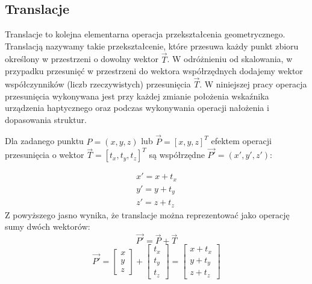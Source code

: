 \documentclass[licencjacka]{pracamgr}
\begin{document}
\subsection{Translacje}
Translacje to kolejna elementarna operacja przekształcenia geometrycznego. Translacją nazywamy takie przekształcenie, które przesuwa każdy punkt zbioru określony w przestrzeni o dowolny wektor $\vec{T}$. W odróżnieniu od skalowania, w przypadku przesunięć w przestrzeni do wektora współrzędnych dodajemy wektor współczynników (liczb rzeczywistych) przesunięcia $\vec{T}$. W niniejszej pracy operacja przesunięcia wykonywana jest przy każdej zmianie położenia wskaźnika urządzenia haptycznego oraz podczas wykonywania operacji nałożenia i dopasowania struktur. 

Dla zadanego punktu $P=(x,y,z)$ lub $\vec{P}=[x,y,z]^T$ efektem operacji przesunięcia o wektor $\vec{T}=[t_x, t_y, t_z]^T$ są współrzędne $\vec{P'}=(x',y',z')$:

$$
\begin{array}{lr}
x'=x+t_x \\
y'=y+t_y \\
z'=z+t_z
\end{array}
$$
Z powyższego jasno wynika, że translacje można reprezentować jako operację sumy dwóch wektorów:
$$
\vec{P'}=\vec{P}+\vec{T}
$$
$$
\vec{P'}
=
\begin{bmatrix}
x \\
y \\
z
\end{bmatrix}
+
\begin{bmatrix}
t_x \\
t_y \\
t_z 
\end{bmatrix}
=
\begin{bmatrix}
x+t_x \\
y+t_y \\
z+t_z 
\end{bmatrix}
$$
\end{document}
